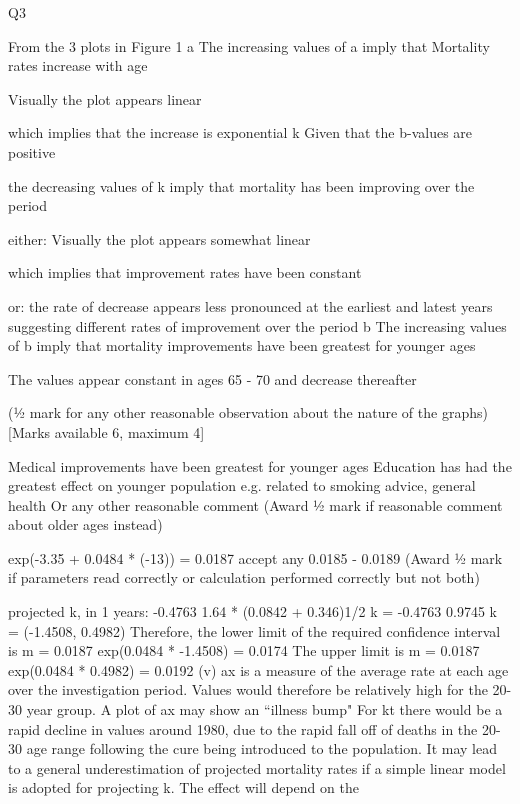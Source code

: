 Q3
\item  
From the 3 plots in Figure 1
a
The increasing values of a imply that Mortality rates increase with age \item 
Visually the plot appears linear \item 
which implies that the increase is exponential 
k
Given that the b-values are positive \item 
\medskip 
the decreasing values of k imply that mortality has been improving over the period \item 
either: Visually the plot appears somewhat linear \item 
which implies that improvement rates have been constant \item 
or: the rate of decrease appears less pronounced at the earliest and latest years
suggesting different rates of improvement over the period 
b
The increasing values of b imply that mortality improvements have been greatest
for younger ages \item 
The values appear constant in ages 65 - 70 and decrease thereafter \item 
(½ mark for any other reasonable observation about the nature of the graphs)
[Marks available 6, maximum 4]
\item  
Medical improvements have been greatest for younger ages
Education has had the greatest effect on younger population e.g. related to smoking advice, general health
Or any other reasonable comment 
(Award ½ mark if reasonable comment about older ages instead)
\item 
exp(-3.35 + 0.0484 * (-13)) = 0.0187 accept any 0.0185 - 0.0189 
(Award ½ mark if parameters read correctly or calculation performed correctly but not both)
\item 
projected k, in 1 years: -0.4763 1.64 * (0.0842 + 0.346)1/2 
k = -0.4763 0.9745 
k = (-1.4508, 0.4982) 
Therefore, the lower limit of the required confidence interval is
m = 0.0187 exp(0.0484 * -1.4508) = 0.0174 
The upper limit is m = 0.0187 exp(0.0484 * 0.4982) = 0.0192 
(v)
ax is a measure of the average rate at each age over the investigation period. Values
would therefore be relatively high for the 20-30 year group. A plot of ax may show
an “illness bump" 
For kt there would be a rapid decline in values around 1980, due to the rapid fall off
of deaths in the 20-30 age range following the cure being introduced to the
population. It may lead to a general underestimation of projected mortality rates if a simple linear model is adopted for projecting k. The effect will depend on the

